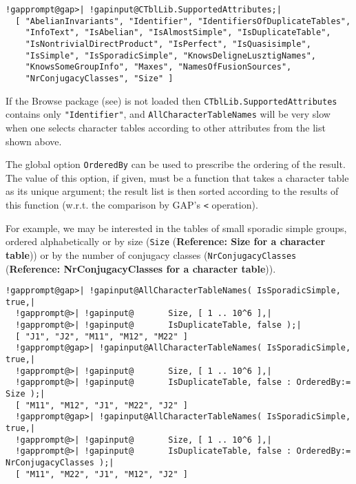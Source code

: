 \documentclass[a4paper,11pt]{report}
\begin{document}
{{{ 
\begin{Verbatim}[commandchars=!@|,fontsize=\small,frame=single,label=Example]
  !gapprompt@gap>| !gapinput@CTblLib.SupportedAttributes;|
  [ "AbelianInvariants", "Identifier", "IdentifiersOfDuplicateTables", 
    "InfoText", "IsAbelian", "IsAlmostSimple", "IsDuplicateTable", 
    "IsNontrivialDirectProduct", "IsPerfect", "IsQuasisimple", 
    "IsSimple", "IsSporadicSimple", "KnowsDeligneLusztigNames", 
    "KnowsSomeGroupInfo", "Maxes", "NamesOfFusionSources", 
    "NrConjugacyClasses", "Size" ]
\end{Verbatim}
 

 If the \textsf{Browse} package (see{\nobreakspace}\cite{Browse}) is not loaded then \texttt{CTblLib.SupportedAttributes} contains only \texttt{"Identifier"}, and \texttt{AllCharacterTableNames} will be very slow when one selects character tables according to other
attributes from the list shown above. 

 The global option \texttt{OrderedBy} can be used to prescribe the ordering of the result. The value of this option,
if given, must be a function that takes a character table as its unique
argument; the result list is then sorted according to the results of this
function (w.{\nobreakspace}r.{\nobreakspace}t. the comparison by \textsf{GAP}'s \texttt{\texttt{}{\textless}} operation). 

 For example, we may be interested in the tables of small sporadic simple
groups, ordered alphabetically or by size (\texttt{Size} (\textbf{Reference: Size for a character table})) or by the number of conjugacy classes (\texttt{NrConjugacyClasses} (\textbf{Reference: NrConjugacyClasses for a character table})). 

 
\begin{Verbatim}[commandchars=!@|,fontsize=\small,frame=single,label=Example]
  !gapprompt@gap>| !gapinput@AllCharacterTableNames( IsSporadicSimple, true,|
  !gapprompt@>| !gapinput@       Size, [ 1 .. 10^6 ],|
  !gapprompt@>| !gapinput@       IsDuplicateTable, false );|
  [ "J1", "J2", "M11", "M12", "M22" ]
  !gapprompt@gap>| !gapinput@AllCharacterTableNames( IsSporadicSimple, true,|
  !gapprompt@>| !gapinput@       Size, [ 1 .. 10^6 ],|
  !gapprompt@>| !gapinput@       IsDuplicateTable, false : OrderedBy:= Size );|
  [ "M11", "M12", "J1", "M22", "J2" ]
  !gapprompt@gap>| !gapinput@AllCharacterTableNames( IsSporadicSimple, true,|
  !gapprompt@>| !gapinput@       Size, [ 1 .. 10^6 ],|
  !gapprompt@>| !gapinput@       IsDuplicateTable, false : OrderedBy:= NrConjugacyClasses );|
  [ "M11", "M22", "J1", "M12", "J2" ]
\end{Verbatim}
 

}}}
\end{document}
